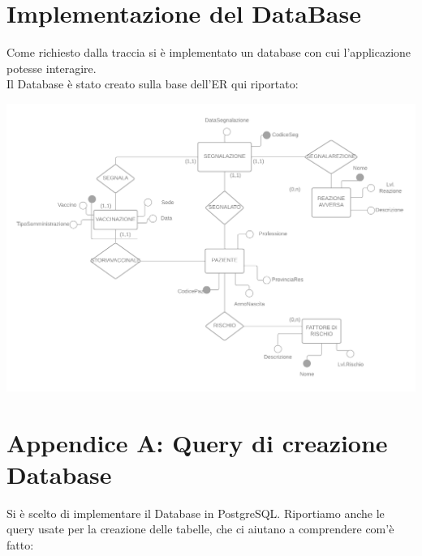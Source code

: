 \documentclass{article}
\begin{document}
\newpage
    \section{Implementazione del DataBase}
    Come richiesto dalla traccia si è implementato un database con cui l'applicazione potesse interagire.\\
    Il Database è stato creato sulla base dell'ER qui riportato:
        \begin{center}
            \includegraphics[width=1\textwidth]{pictures/_Diagramma vuoto.png}
        \end{center}

\newpage
    \section*{Appendice A: Query di creazione Database}

    Si è scelto di implementare il Database in PostgreSQL. Riportiamo anche le query usate per la creazione delle tabelle, che ci aiutano a comprendere com'è fatto:
\end{document}

